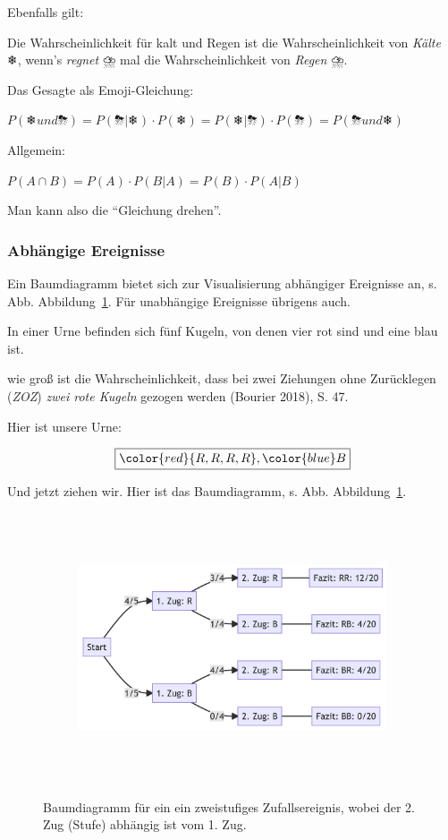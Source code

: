 \documentclass[
  a4paper,
  DIV=11]{scrreprt}
\theoremstyle{definition}
\theoremstyle{remark}
\begin{document}
Ebenfalls gilt:

Die Wahrscheinlichkeit für kalt und Regen ist die Wahrscheinlichkeit von
\emph{Kälte} ❄, wenn's \emph{regnet} ⛈️ mal die Wahrscheinlichkeit von
\emph{Regen} ⛈️.

Das Gesagte als Emoji-Gleichung:

\(P(❄️ und ⛈️) = P(⛈️ |❄️ ) \cdot P(❄️) = P(❄️ |⛈️ ) \cdot P(⛈️) = P(⛈️ und ❄️)\)

Allgemein:

\(P(A\cap B) = P(A) \cdot P(B|A) = P(B) \cdot P(A|B)\)

Man kann also die ``Gleichung drehen''.

\hypertarget{abhuxe4ngige-ereignisse}{%
\subsubsection{Abhängige Ereignisse}\label{abhuxe4ngige-ereignisse}}

Ein Baumdiagramm bietet sich zur Visualisierung abhängiger Ereignisse
an, s. Abb. Abbildung~\ref{fig-baum-abh}. Für unabhängige Ereignisse
übrigens auch.

In einer Urne befinden sich fünf Kugeln, von denen vier rot sind und
eine blau ist.

wie groß ist die Wahrscheinlichkeit, dass bei zwei Ziehungen ohne
Zurücklegen (\emph{ZOZ}) \emph{zwei rote Kugeln} gezogen werden (Bourier
2018), S. 47.

Hier ist unsere Urne:

\[\boxed{\color{red}{R, R, R, R}, \color{blue}B}\]

Und jetzt ziehen wir. Hier ist das Baumdiagramm, s. Abb.
Abbildung~\ref{fig-baum-abh}.

\begin{figure}

{\centering 

\begin{figure}[H]

{\centering \includegraphics[width=5.81in,height=3.13in]{./Wskt_files/figure-latex/mermaid-figure-1.png}

}

\end{figure}

}

\caption{\label{fig-baum-abh}Baumdiagramm für ein ein zweistufiges
Zufallsereignis, wobei der 2. Zug (Stufe) abhängig ist vom 1. Zug.}

\end{figure}
\end{document}
